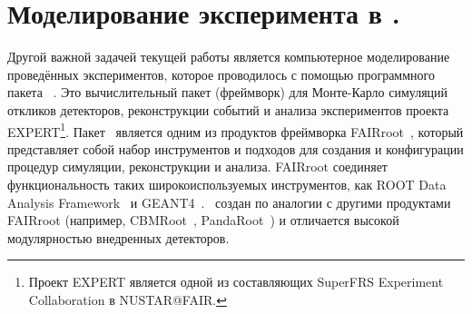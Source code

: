 \section{Моделирование эксперимента в \er.}
\label{section:simulations}

Другой важной задачей текущей работы является компьютерное моделирование проведённых экспериментов, которое проводилось с помощью программного пакета \er~\cite{er}.
Это вычислительный пакет (фреймворк) для Монте-Карло симуляций откликов детекторов, реконструкции событий и анализа экспериментов проекта EXPERT\footnote{Проект EXPERT является одной из составляющих SuperFRS Experiment Collaboration в NUSTAR@FAIR.}.
Пакет \er\ является одним из продуктов фреймворка FAIRroot~\cite{FAIRroot}, который представляет собой набор инструментов и подходов для создания и конфигурации процедур симуляции, реконструкции и анализа. FAIRroot соединяет функциональность таких широкоиспользуемых инструментов, как ROOT Data Analysis Framework~\cite{root} и GEANT4~\cite{geant}.
\er\ создан по аналогии с другими продуктами FAIRroot (например, CBMRoot~\cite{CBMroot}, PandaRoot~\cite{PANDAroot}) и отличается высокой модулярностью внедренных детекторов.

